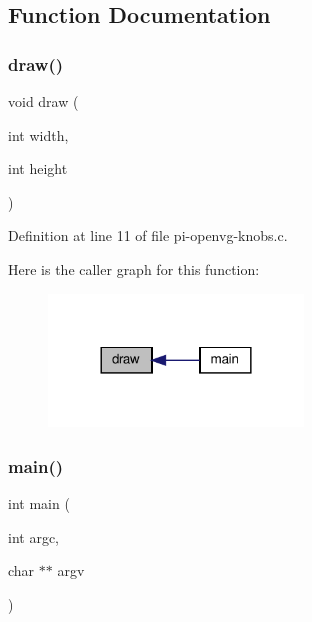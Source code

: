 \subsection{Function Documentation}
\mbox{\label{pi-openvg-knobs_8c_a358d026c8b5c38a548bac21e2e279719}} 
\subsubsection{\texorpdfstring{draw()}{draw()}}
{\footnotesize\ttfamily void draw (\begin{DoxyParamCaption}\item[{int}]{width,  }\item[{int}]{height }\end{DoxyParamCaption})}



Definition at line 11 of file pi-\/openvg-\/knobs.\+c.

Here is the caller graph for this function\+:\nopagebreak
\begin{figure}[H]
\begin{center}
\leavevmode
\includegraphics[width=192pt]{pi-openvg-knobs_8c_a358d026c8b5c38a548bac21e2e279719_icgraph}
\end{center}
\end{figure}
\mbox{\label{pi-openvg-knobs_8c_a3c04138a5bfe5d72780bb7e82a18e627}} 
\subsubsection{\texorpdfstring{main()}{main()}}
{\footnotesize\ttfamily int main (\begin{DoxyParamCaption}\item[{int}]{argc,  }\item[{char $\ast$$\ast$}]{argv }\end{DoxyParamCaption})}



